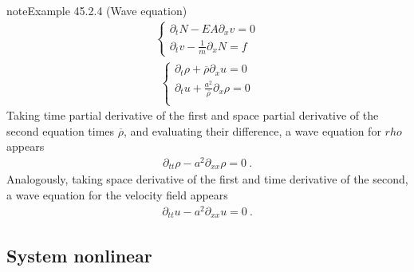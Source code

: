 \documentclass[letterpaper,10pt,english]{jupyterBook}
\begin{document}
\begin{sphinxadmonition}{note}{Example 45.2.4 (Wave equation)}
\begin{equation*}
\begin{split}
\begin{cases}
  \partial_t N - EA \partial_x v = 0 \\
  \partial_t v - \frac{1}{m}\partial_x N = f
\end{cases}\end{split}
\end{equation*}
\sphinxAtStartPar
{}
\begin{equation*}
\begin{split}\begin{cases}
  \partial_t \rho + \overline{\rho} \partial_x u = 0 \\
  \partial_t u    + \frac{a^2}{\overline{\rho}} \partial_x \rho = 0 \\
\end{cases}\end{split}
\end{equation*}
\sphinxAtStartPar
Taking time partial derivative of the first and space partial derivative of the second equation times \(\overline{\rho}\), and evaluating their difference, a wave equation for \(rho\) appears
\begin{equation*}
\begin{split}\partial_{tt} \rho - a^2 \partial_{xx} \rho = 0 \ .\end{split}
\end{equation*}
\sphinxAtStartPar
Analogously, taking space derivative of the first and time derivative of the second, a wave equation for the velocity field appears
\begin{equation*}
\begin{split}\partial_{tt} u - a^2 \partial_{xx} u = 0 \ .\end{split}
\end{equation*}\end{sphinxadmonition}


\subsection{System non\sphinxhyphen{}linear}
\label{\detokenize{ch/pde/hyperbolic-dimensions:system-non-linear}}\label{\detokenize{ch/pde/hyperbolic-dimensions:pde-hyperbolic-system-non-linear}}
\end{document}
